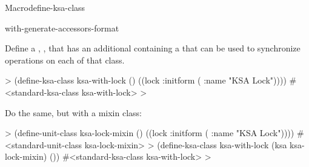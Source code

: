 \documentclass[10pt,twoside,english,pdftex]{article}
\begin{document}
\begin{functiondoc}{Macro}{define-ksa-class}
\classoptioninheritance

\begin{alsos}{with-generate-accessors-format}
\also[define-ks]
\end{alsos}

\fnexamples
Define a ,
, that has an additional 
containing a  that can be used to synchronize
operations on each  of that class.
%
\W\supp
\begin{example}
  > (define-ksa-class ksa-with-lock ()
      ((lock :initform ( :name "KSA Lock"))))
  #<standard-ksa-class ksa-with-lock>
  >
\end{example}
%
Do the same, but with a mixin class:
%
\W\supp\notpretop
\begin{example}
  > (define-unit-class ksa-lock-mixin ()
      ((lock :initform ( :name "KSA Lock"))))
  #<standard-unit-class ksa-lock-mixin>
  > (define-ksa-class ksa-with-lock (ksa ksa-lock-mixin)
      ())
  #<standard-ksa-class ksa-with-lock>
  >
\end{example}

\end{functiondoc}

\end{document}
